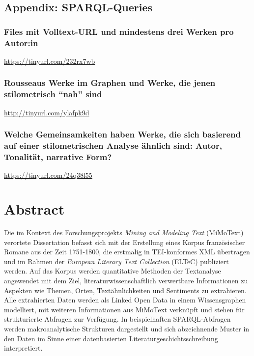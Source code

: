 \documentclass[
  12pt,
  letterpaper,
]{classicthesis}
\begin{document}
\section{Appendix: SPARQL-Queries}\label{appendix-sparql-queries}

\subsection{Files mit Volltext-URL und mindestens drei Werken pro
Autor:in}\label{files-mit-volltext-url-und-mindestens-drei-werken-pro-autorin}

\url{https://tinyurl.com/232rx7wb}

\subsection{Rousseaus Werke im Graphen und Werke, die jenen
stilometrisch ``nah''
sind}\label{rousseaus-werke-im-graphen-und-werke-die-jenen-stilometrisch-nah-sind-1}

\url{http://tinyurl.com/ylafpk9d}

\subsection{Welche Gemeinsamkeiten haben Werke, die sich basierend auf
einer stilometrischen Analyse ähnlich sind: Autor, Tonalität, narrative
Form?}\label{welche-gemeinsamkeiten-haben-werke-die-sich-basierend-auf-einer-stilometrischen-analyse-uxe4hnlich-sind-autor-tonalituxe4t-narrative-form-1}

\url{https://tinyurl.com/24q38l55}


\chapter{Abstract}\label{abstract}

Die im Kontext des Forschungsprojekts \emph{Mining and Modeling Text}
(MiMoText) verortete Dissertation befasst sich mit der Erstellung eines
Korpus französischer Romane aus der Zeit 1751-1800, die erstmalig in
TEI-konformes XML übertragen und im Rahmen der \emph{European Literary
Text Collection} (ELTeC) publiziert werden. Auf das Korpus werden
quantitative Methoden der Textanalyse angewendet mit dem Ziel,
literaturwissenschaftlich verwertbare Informationen zu Aspekten wie
Themen, Orten, Textähnlichkeiten und Sentiments zu extrahieren. Alle
extrahierten Daten werden als Linked Open Data in einem Wissensgraphen
modelliert, mit weiteren Informationen aus MiMoText verknüpft und stehen
für strukturierte Abfragen zur Verfügung. In beispielhaften
SPARQL-Abfragen werden makroanalytische Strukturen dargestellt und sich
abzeichnende Muster in den Daten im Sinne einer datenbasierten
Literaturgeschichtsschreibung interpretiert.
\end{document}
